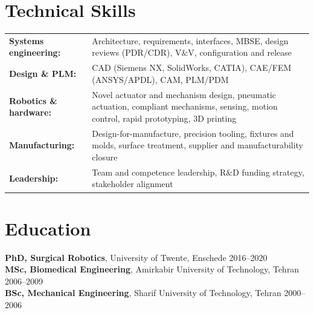 \documentclass[10pt,a4paper]{article}
\begin{document}
\section{Technical Skills}
{\small
\begin{tabularx}{\textwidth}{@{}lX@{}}
  \textbf{Systems engineering:} & Architecture, requirements, interfaces, MBSE, design reviews (PDR/CDR), V\&V, configuration and release \\
  \textbf{Design \& PLM:} & CAD (Siemens NX, SolidWorks, CATIA), CAE/FEM (ANSYS/APDL), CAM, PLM/PDM \\
  \textbf{Robotics \& hardware:} & Novel actuator and mechanism design, pneumatic actuation, compliant mechanisms, sensing, motion control, rapid prototyping, 3D printing \\
  \textbf{Manufacturing:} & Design-for-manufacture, precision tooling, fixtures and molds, surface treatment, supplier and manufacturability closure \\
  \textbf{Leadership:} & Team and competence leadership, R\&D funding strategy, stakeholder alignment \\
\end{tabularx}
}

\section{Education}
\textbf{PhD, Surgical Robotics}, University of Twente, Enschede \hfill 2016--2020 \\[2pt]
\textbf{MSc, Biomedical Engineering}, Amirkabir University of Technology, Tehran \hfill 2006--2009 \\[2pt]
\textbf{BSc, Mechanical Engineering}, Sharif University of Technology, Tehran \hfill 2000--2006
\end{document}
